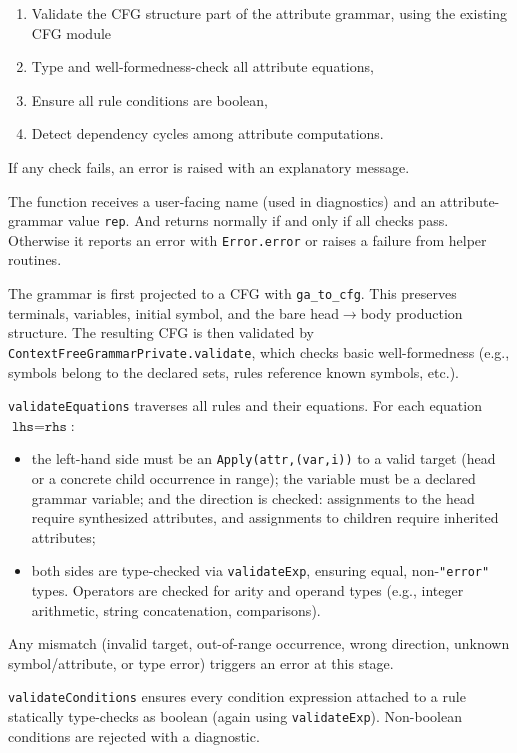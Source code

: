 \begin{enumerate}
  \item Validate the CFG structure part of the attribute grammar, using the existing CFG module
  \item Type and well-formedness-check all attribute equations,
  \item Ensure all rule conditions are boolean,
  \item Detect dependency cycles among attribute computations. 
\end{enumerate}

If any check fails, an error is raised with an explanatory message. 

The function receives a user-facing name (used in diagnostics) and an attribute-grammar value \texttt{rep}. And returns normally if and only 
if all checks pass. Otherwise it reports an error with \texttt{Error.error} or raises a failure from helper routines. 

The grammar is first projected to a CFG with \texttt{ga\_to\_cfg}. This preserves terminals, variables, initial symbol, and the bare head\(\to\)body production 
structure. The resulting CFG is then validated by \texttt{ContextFreeGrammarPrivate.validate}, which checks basic well-formedness (e.g., symbols belong to the 
declared sets, rules reference known symbols, etc.). 

\texttt{validateEquations} traverses all rules and their equations. For each equation \( \texttt{lhs} = \texttt{rhs} \):
\begin{itemize}
  \item the left-hand side must be an \texttt{Apply(attr,(var,i))} to a valid target (head or a concrete child occurrence in range); the variable must be 
  a declared grammar variable; and the direction is checked: assignments to the head require synthesized attributes, and assignments to children require 
  inherited attributes; 
  \item both sides are type-checked via \texttt{validateExp}, ensuring equal, non-\texttt{"error"} types. Operators are checked for arity and operand types 
  (e.g., integer arithmetic, string concatenation, comparisons). 
\end{itemize}
Any mismatch (invalid target, out-of-range occurrence, wrong direction, unknown symbol/attribute, or type error) triggers an error at this stage. 

\texttt{validateConditions} ensures every condition expression attached to a rule statically type-checks as boolean (again using \texttt{validateExp}). 
Non-boolean conditions are rejected with a diagnostic. 

